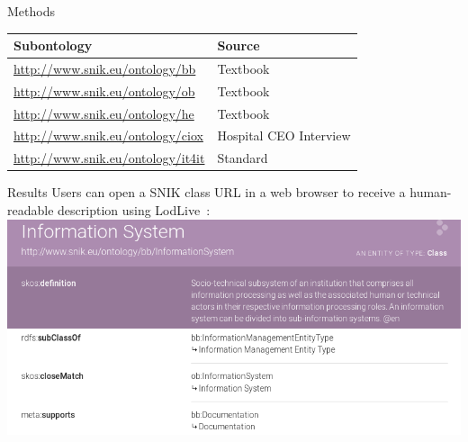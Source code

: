 \documentclass[portrait,final,a0paper,fontscale=0.310]{baposter}
\begin{document}
\begin{poster}
\begin{posterbox}[name=methods,below=background]{Methods}
\begin{center}
\begin{tabular*}{0.96\columnwidth}{ll}
\toprule
Subontology					&Source\\
\midrule
\url{http://www.snik.eu/ontology/bb}		&Textbook~\cite{bb}\\
\url{http://www.snik.eu/ontology/ob}		&Textbook~\cite{ob}\\
\url{http://www.snik.eu/ontology/he}		&Textbook~\cite{he}\\
\url{http://www.snik.eu/ontology/ciox}		&Hospital CEO Interview\\
\url{http://www.snik.eu/ontology/it4it}		&Standard~\cite{it4it}\\
\bottomrule
\end{tabular*}
\end{center}

\end{posterbox}
\begin{posterbox}[name=results,column=1]{Results}
Users can open a SNIK class URL in a web browser to receive a human-readable description using LodLive~\cite{lodlive}:
\includegraphics[width=\textwidth]{img/lodlive.png}


\end{posterbox}
\end{poster}
\end{document}
